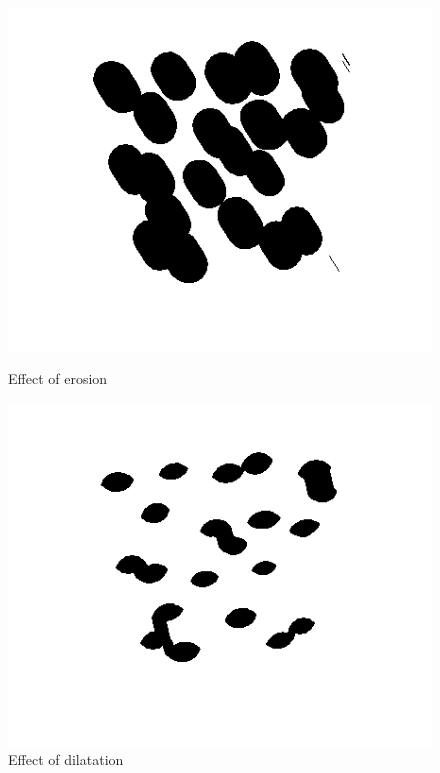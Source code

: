 \begin{figure}[H]
	\centering
	\begin{minipage}[t]{0.4\textwidth}
		\includegraphics[width=\textwidth]{images/bloodBWeroded.png}
		\caption{Effect of erosion}
		\label{fig:bloodBWeroded}
	\end{minipage}
	\begin{minipage}[t]{0.4\textwidth}
		\includegraphics[width=\textwidth]{images/bloodBWdilated.png}
		\caption{Effect of dilatation}
		\label{fig:bloodBWdilated}
	\end{minipage}
\end{figure}


